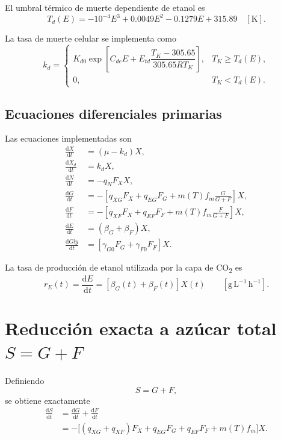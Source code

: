 \documentclass[11pt,a4paper]{article}
\newcommand{\dd}{\mathrm{d}}
\newcommand{\gLh}{\mathrm{g\,L^{-1}\,h^{-1}}}
\begin{document}
El umbral térmico de muerte dependiente de etanol es
\begin{equation}
T_d(E)=
-10^{-4}E^3+0.0049E^2-0.1279E+315.89
\quad [\mathrm{K}].
\end{equation}

La tasa de muerte celular se implementa como
\begin{equation}
k_d=
\begin{cases}
K_{d0}
\exp\left[
C_{de}E+
E_{td}\dfrac{T_K-305.65}{305.65RT_K}
\right],
& T_K\geq T_d(E),\\[8pt]
0,
& T_K<T_d(E).
\end{cases}
\end{equation}

\subsection{Ecuaciones diferenciales primarias}

Las ecuaciones implementadas son
\begin{align}
\frac{\dd X}{\dd t}
&=(\mu-k_d)X,
\label{eq:x}\\
\frac{\dd X_d}{\dd t}
&=k_dX,
\label{eq:xd}\\
\frac{\dd N}{\dd t}
&=-q_NF_XX,
\label{eq:n}\\
\frac{\dd G}{\dd t}
&=
-\left[
q_{XG}F_X
+q_{EG}F_G
+m(T)f_m\frac{G}{G+F}
\right]X,
\label{eq:g}\\
\frac{\dd F}{\dd t}
&=
-\left[
q_{XF}F_X
+q_{EF}F_F
+m(T)f_m\frac{F}{G+F}
\right]X,
\label{eq:f}\\
\frac{\dd E}{\dd t}
&=
(\beta_G+\beta_F)X,
\label{eq:e}\\
\frac{\dd Gly}{\dd t}
&=
\left[
\gamma_{G0}F_G+\gamma_{F0}F_F
\right]X.
\label{eq:gly}
\end{align}

La tasa de producción de etanol utilizada por la capa de CO\textsubscript{2} es
\begin{equation}
\boxed{
r_E(t)=\frac{\dd E}{\dd t}
=
\left[\beta_G(t)+\beta_F(t)\right]X(t)}
\qquad [\gLh].
\label{eq:rE}
\end{equation}

\section{Reducción exacta a azúcar total $S=G+F$}
\label{sec:s_reduction}

Definiendo
\[
S=G+F,
\]
se obtiene exactamente
\begin{align}
\frac{\dd S}{\dd t}
&=
\frac{\dd G}{\dd t}
+
\frac{\dd F}{\dd t}\\
&=
-\Big[
(q_{XG}+q_{XF})F_X
+q_{EG}F_G
+q_{EF}F_F
+m(T)f_m
\Big]X.
\label{eq:S_total}
\end{align}
\end{document}
